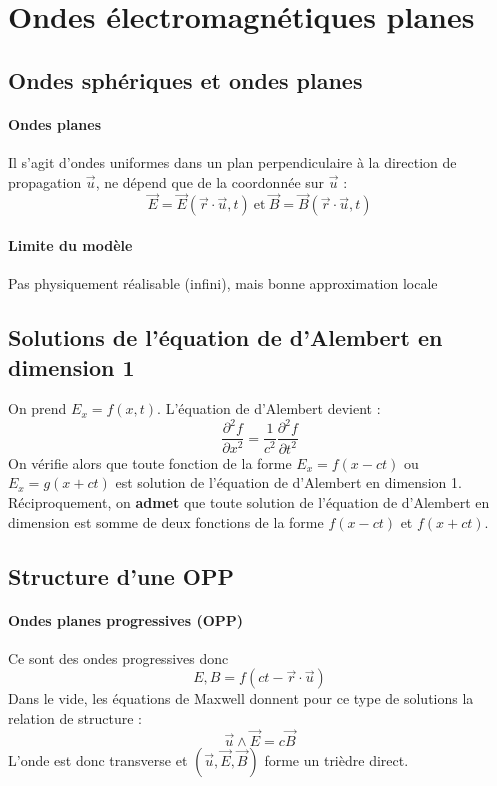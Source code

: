 \documentclass[french]{book}
\theoremstyle{plain}
\theoremstyle{definition}
\theoremstyle{remark}
\begin{document}
\section{Ondes électromagnétiques planes}
\subsection{Ondes sphériques et ondes planes}
\paragraph{Ondes planes} Il s'agit d'ondes uniformes dans un plan perpendiculaire à la direction de propagation $\overrightarrow{u}$, ne dépend que de la coordonnée sur $\overrightarrow{u}$ : $$\overrightarrow{E}=\overrightarrow{E}\left(\overrightarrow{r}\cdot\overrightarrow{u},t\right) \ \text{et} \ \overrightarrow{B}=\overrightarrow{B}\left(\overrightarrow{r}\cdot\overrightarrow{u},t\right)$$
\paragraph{Limite du modèle} Pas physiquement réalisable (infini), mais bonne approximation locale
\subsection{Solutions de l'équation de d'Alembert en dimension 1}
On prend $E_x=f(x,t)$. L'équation de d'Alembert devient : $$\frac{\partial^2f}{\partial x^2}=\frac{1}{c^2}\frac{\partial^2 f}{\partial t^2}$$ On vérifie alors que toute fonction de la forme $E_x=f(x-ct)$ ou $E_x=g(x+ct)$ est solution de l'équation de d'Alembert en dimension 1. Réciproquement, on \textbf{admet} que toute solution de l'équation de d'Alembert en dimension est somme de deux fonctions de la forme $f(x-ct)$ et $f(x+ct)$.
\subsection{Structure d'une OPP}
\paragraph{Ondes planes progressives (OPP)} Ce sont des ondes progressives donc $$E,B=f\left(ct-\overrightarrow{r}\cdot\overrightarrow{u}\right)$$ Dans le vide, les équations de Maxwell donnent pour ce type de solutions la relation de structure : $$\overrightarrow{u}\wedge\overrightarrow{E}=c\overrightarrow{B}$$ L'onde est donc transverse et $\left(\overrightarrow{u},\overrightarrow{E},\overrightarrow{B}\right)$ forme un trièdre direct.
\end{document}
